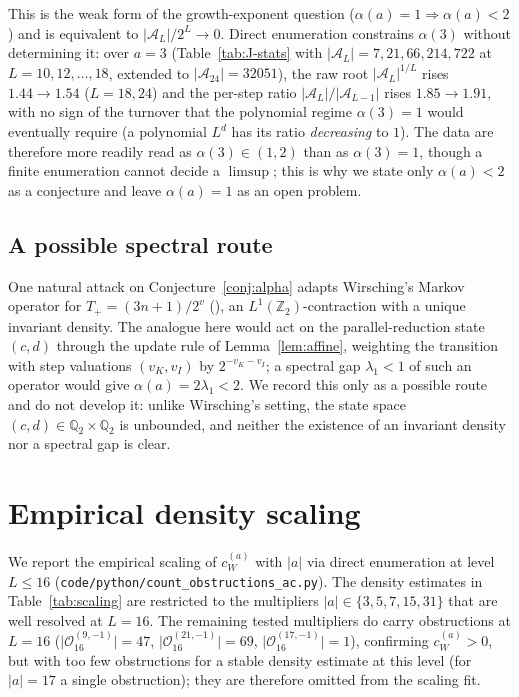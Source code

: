 \documentclass[11pt,reqno]{amsart}
\theoremstyle{plain}
\theoremstyle{definition}
\theoremstyle{remark}
\newcommand{\Tpos}{T_{+}}
\newcommand{\Qtwo}{\mathbb{Q}_{2}}
\newcommand{\Ztwo}{\mathbb{Z}_{2}}
\newcommand{\Obs}{\mathcal{O}}
\newcommand{\Atom}{\mathcal{A}}
\newcommand{\cWa}{c_{W}^{(a)}}
\newcommand{\srcpath}[1]{\nolinkurl{#1}}
\begin{document}
This is the weak form of the growth-exponent question
($\alpha(a) = 1 \Rightarrow \alpha(a) < 2$) and is equivalent to
$\lvert \Atom_L \rvert / 2^L \to 0$. Direct enumeration constrains
$\alpha(3)$ without determining it: over $a = 3$ (Table~\ref{tab:J-stats}
with $\lvert \Atom_L \rvert = 7, 21, 66, 214, 722$ at
$L = 10, 12, \ldots, 18$, extended to $\lvert \Atom_{24} \rvert = 32051$),
the raw root $\lvert \Atom_L \rvert^{1/L}$ rises $1.44 \to 1.54$
($L = 18, 24$) and the per-step ratio
$\lvert \Atom_L \rvert / \lvert \Atom_{L-1} \rvert$ rises
$1.85 \to 1.91$, with no sign of the turnover that the polynomial regime
$\alpha(3) = 1$ would eventually require (a polynomial $L^d$ has its ratio
\emph{decreasing} to $1$). The data are therefore more readily read as
$\alpha(3) \in (1, 2)$ than as $\alpha(3) = 1$, though a finite
enumeration cannot decide a $\limsup$; this is why we state only
$\alpha(a) < 2$ as a conjecture and leave $\alpha(a) = 1$ as an open
problem.

\subsection{A possible spectral route}

One natural attack on Conjecture~\ref{conj:alpha} adapts Wirsching's
Markov operator for $\Tpos = (3n+1)/2^v$ (\cite{Wirsching1998}), an
$L^1(\Ztwo)$-contraction with a unique invariant density. The analogue
here would act on the parallel-reduction state $(c, d)$ through the update
rule of Lemma~\ref{lem:affine}, weighting the transition with step
valuations $(v_K, v_I)$ by $2^{-v_K - v_I}$; a spectral gap $\lambda_1 < 1$
of such an operator would give $\alpha(a) = 2\lambda_1 < 2$. We record this
only as a possible route and do not develop it: unlike Wirsching's setting,
the state space $(c, d) \in \Qtwo \times \Qtwo$ is unbounded, and neither
the existence of an invariant density nor a spectral gap is clear.

\section{Empirical density scaling}\label{sec:scaling}

We report the empirical scaling of $\cWa$ with $\lvert a \rvert$ via
direct enumeration at level $L \le 16$
(\srcpath{code/python/count_obstructions_ac.py}). The density estimates
in Table~\ref{tab:scaling} are restricted to the multipliers
$\lvert a \rvert \in \{3, 5, 7, 15, 31\}$ that are well resolved at
$L = 16$. The remaining tested multipliers do carry obstructions at
$L = 16$ ($\lvert\Obs_{16}^{(9,-1)}\rvert = 47$,
$\lvert\Obs_{16}^{(21,-1)}\rvert = 69$,
$\lvert\Obs_{16}^{(17,-1)}\rvert = 1$), confirming $\cWa > 0$, but with
too few obstructions for a stable density estimate at this level
(for $\lvert a \rvert = 17$ a single obstruction); they are therefore
omitted from the scaling fit.
\end{document}
